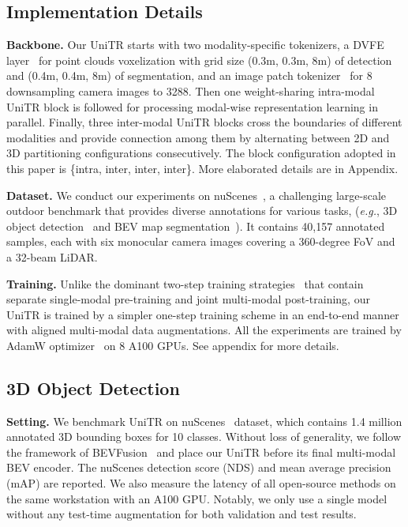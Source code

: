 \documentclass[10pt,twocolumn,letterpaper]{article}
\begin{document}
\subsection{Implementation Details}
\noindent \textbf{Backbone.} Our UniTR starts with two modality-specific tokenizers, a DVFE layer~\cite{zhou2020end} for point clouds voxelization with grid size (0.3m, 0.3m, 8m) of detection and (0.4m, 0.4m, 8m) of segmentation, and an image patch tokenizer~\cite{dosovitskiy2020image} for 8 downsampling camera images to 3288. Then one weight-sharing intra-modal UniTR block is followed for processing modal-wise representation learning in parallel. Finally, three inter-modal UniTR blocks cross the boundaries of different modalities and provide connection among them by alternating between 2D and 3D partitioning configurations consecutively. The block configuration adopted in this paper is \{intra, inter, inter, inter\}. More elaborated details are in Appendix. 

\noindent \textbf{Dataset.} We conduct our experiments on nuScenes~\cite{caesar2020nuscenes}, a challenging large-scale outdoor benchmark that provides diverse annotations for various tasks, (\emph{e.g.}, 3D object detection~\cite{yin2021cvpr} and BEV map segmentation~\cite{liu2022bevfusion,li2022hdmapnet}). It contains 40,157 annotated samples, each with six monocular camera images covering a 360-degree FoV and a 32-beam LiDAR.

\noindent \textbf{Training.} Unlike the dominant two-step training strategies~\cite{liu2022bevfusion,liang2022bevfusion,bai2022transfusion} that contain separate single-modal pre-training and joint multi-modal post-training, our UniTR is trained by a simpler one-step training scheme in an end-to-end manner with aligned multi-modal data augmentations. All the experiments are trained by AdamW optimizer~\cite{loshchilov2018decoupled} on 8 A100 GPUs. See appendix for more details. 
\subsection{3D Object Detection}
\noindent \textbf{Setting.} We benchmark UniTR on nuScenes~\cite{caesar2020nuscenes} dataset, which contains 1.4 million annotated 3D bounding boxes for 10 classes. Without loss of generality, we follow the framework of BEVFusion~\cite{liu2022bevfusion} and place our UniTR before its final multi-modal BEV encoder. The nuScenes detection score (NDS) and mean average precision (mAP) are reported. We also measure the latency of all open-source methods on the same workstation with an A100 GPU. Notably, we only use a single model without any test-time augmentation for both validation and test results.
\end{document}
